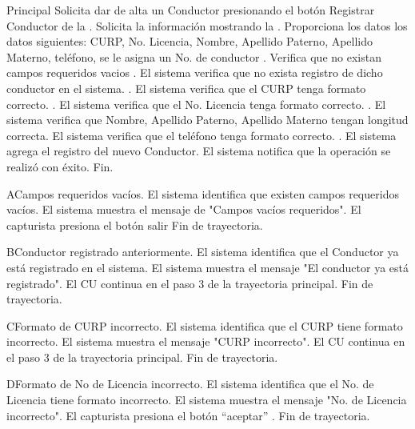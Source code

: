 \begin{UCtrayectoria}{Principal}
	\UCpaso[\UCactor] Solicita dar de alta un Conductor presionando el botón Registrar
	Conductor de la .
	\UCpaso Solicita la información mostrando la .
	\UCpaso[\UCactor] Proporciona los datos los datos siguientes: CURP, No. Licencia, Nombre, Apellido Paterno, Apellido Materno, teléfono, se
	le asigna un No. de conductor .
	\UCpaso Verifica que no existan campos requeridos vacios .
	\UCpaso El sistema verifica que no exista registro de dicho conductor en el sistema. .
	\UCpaso El sistema verifica que el CURP tenga formato correcto. .
	\UCpaso El sistema verifica que el No. Licencia tenga formato correcto. .
	\UCpaso El sistema verifica que Nombre, Apellido Paterno, Apellido Materno tengan longitud correcta. 
	\UCpaso El sistema verifica que el teléfono tenga formato correcto. .
	\UCpaso El sistema agrega el registro del nuevo Conductor.
	\UCpaso El sistema notifica que la operación se realizó con éxito.
	\UCpaso Fin.
	
	
\end{UCtrayectoria}
	
\begin{UCtrayectoriaA}{A}{Campos requeridos vacíos.}
	\UCpaso El sistema identifica que existen campos requeridos vacíos.
	\UCpaso El sistema muestra el mensaje de "Campos vacíos requeridos".
	\UCpaso El capturista presiona el botón salir
	\UCpaso Fin de trayectoria.
\end{UCtrayectoriaA}

\begin{UCtrayectoriaA}{B}{Conductor registrado anteriormente.}
	\UCpaso El sistema identifica que el Conductor ya está registrado en el sistema.
	\UCpaso El sistema muestra el mensaje "El conductor ya está registrado".
	\UCpaso El CU continua en el paso 3 de la trayectoria principal.
	\UCpaso Fin de trayectoria.
\end{UCtrayectoriaA}

\begin{UCtrayectoriaA}{C}{Formato de CURP incorrecto.}
	\UCpaso El sistema identifica que el CURP tiene formato incorrecto.
	\UCpaso El sistema muestra el mensaje "CURP incorrecto".
	\UCpaso El CU continua en el paso 3 de la trayectoria principal.
	\UCpaso Fin de trayectoria.
\end{UCtrayectoriaA}

\begin{UCtrayectoriaA}{D}{Formato de No de Licencia incorrecto.}
	\UCpaso El sistema identifica que el No. de Licencia tiene formato incorrecto.
	\UCpaso El sistema muestra el mensaje "No. de Licencia incorrecto".
	\UCpaso El capturista presiona el botón “aceptar”
	\UCpaso. Fin de trayectoria.
\end{UCtrayectoriaA}

